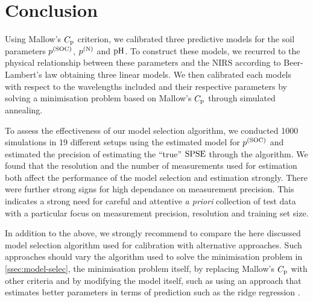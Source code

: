 \section{Conclusion}
\label{sec:conclusion}

	Using Mallow's $C_{\mathrm{p}}$ criterion, we calibrated three predictive models for the soil parameters $p^{(\mathrm{SOC})}$, $p^{(\mathrm{N})}$ and $\mathrm{pH}$.
	To construct these models, we recurred to the physical relationship between these parameters and the NIRS according to Beer-Lambert's law obtaining three linear models.
	We then calibrated each models with respect to the wavelengths included and their respective parameters by solving a minimisation problem based on Mallow's $C_{\mathrm{p}}$ through simulated annealing.
	
	To assess the effectiveness of our model selection algorithm, we conducted 1000 simulations in 19 different setups using the estimated model for $p^{(\mathrm{SOC})}$ and estimated the precision of estimating the \enquote{true} $\mathrm{SPSE}$ through the algorithm.
	We found that the resolution and the number of measurements used for estimation both affect the performance of the model selection and estimation strongly.
	There were further strong signs for high dependance on measurement precision.
	This indicates a strong need for careful and attentive \textsl{a priori} collection of test data with a particular focus on measurement precision, resolution and training set size.
	
	In addition to the above, we strongly recommend to compare the here discussed model selection algorithm used for calibration with alternative approaches.
	Such approaches should vary the algorithm used to solve the minimisation problem in \ref{ssec:model-selec}, the minimisation problem itself, by replacing Mallow's $C_{\mathrm{p}}$ with other criteria and by modifying the model itself, such as using an approach that estimates better parameters in terms of prediction such as the ridge regression \cite{schumacher:16b}.
	

